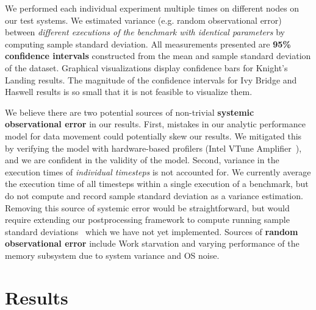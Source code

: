 \documentclass{sig-alternate-05-2015}
\begin{document}
We performed each individual experiment multiple times on different nodes on
  our test systems.
We estimated variance (e.g. random observational error) between \emph{different
  executions of the benchmark with identical parameters} by computing sample
  standard deviation.
All measurements presented are \textbf{95\% confidence intervals} constructed
  from the mean and sample standard deviation of the dataset.
Graphical visualizations display confidence bars for Knight's Landing results.
The magnitude of the confidence intervals for Ivy Bridge and Haswell results is
  so small that it is not feasible to visualize them.~\cite{benchmarking_cpp_code}

We believe there are two potential sources of non-trivial \textbf{systemic
  observational error} in our results.
First, mistakes in our analytic performance model for data movement could potentially
  skew our results.
We mitigated this by verifying the model with hardware-based
  profilers (Intel VTune Amplifier~\cite{intel_vtune_amplifier}), and we are confident
  in the validity of the model.
Second, variance in the execution times of \emph{individual timesteps} is not
  accounted for.
We currently average the execution time of all timesteps
  within a single execution of a benchmark, but do not compute and record
  sample standard deviation as a variance estimation.
Removing this source of systemic error would be straightforward, but
  would require extending our postprocessing framework to compute running 
  sample standard deviations~\cite{benchmarking_cpp_code} which we have not
  yet implemented.
Sources of \textbf{random observational error} include Work starvation and
  varying performance of the memory subsystem due to system variance and OS
  noise.


\section{Results}
\label{sec:results}
\end{document}
